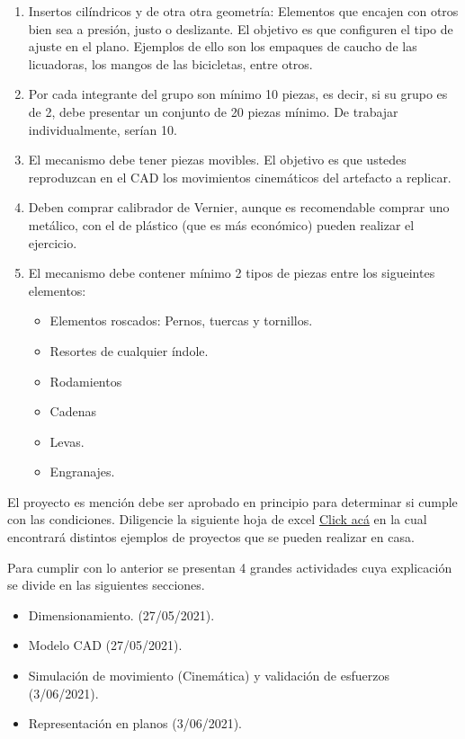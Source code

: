 \documentclass[letterpaper,pdftex]{article}
\begin{document}
\begin{enumerate}
\item Insertos cilíndricos y de otra otra geometría: Elementos que encajen con otros bien sea a presión, justo o deslizante. El objetivo es que configuren el tipo de ajuste en el plano. Ejemplos de ello son los empaques de caucho de las licuadoras, los mangos de las bicicletas, entre otros.
\item Por cada integrante del grupo son mínimo 10 piezas, es decir, si su grupo es de 2, debe presentar un conjunto de 20 piezas mínimo. De trabajar individualmente, serían 10.
\item El mecanismo debe tener piezas movibles. El objetivo es que ustedes reproduzcan en el CAD los movimientos cinemáticos del artefacto a replicar.
\item Deben comprar calibrador de Vernier, aunque es recomendable comprar uno metálico, con el de plástico (que es más económico) pueden realizar el ejercicio.
		
\item El mecanismo debe contener mínimo 2 tipos de piezas entre los sigueintes elementos:

	\begin{itemize}
	\item Elementos roscados: Pernos, tuercas y tornillos.
	\item Resortes de cualquier índole.
	\item Rodamientos 
	\item Cadenas
	\item Levas.
	\item Engranajes.
	\end{itemize}
	

\end{enumerate}

El proyecto es mención debe ser aprobado en principio para determinar si cumple con las condiciones. Diligencie la siguiente hoja de excel \href{https://usbbogedu-my.sharepoint.com/:x:/g/personal/eprieto_usbbog_edu_co/EbDnMvzuUtpPljIkT-3NsnMBCzidd8gOxdZgFu1oSlNxJw?e=AHxVcA}{Click acá} en la cual encontrará distintos ejemplos de proyectos que se pueden realizar en casa.

Para cumplir con lo anterior se presentan 4 grandes actividades cuya explicación se divide en las siguientes secciones.

\begin{itemize}
\item Dimensionamiento. (27/05/2021).
\item Modelo CAD (27/05/2021).
\item Simulación de movimiento (Cinemática) y validación de esfuerzos (3/06/2021).
\item Representación en planos (3/06/2021).
\end{itemize}
\end{document}
